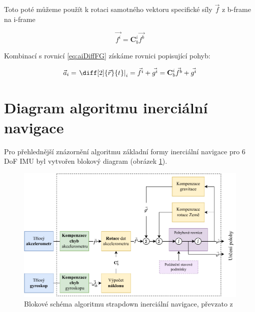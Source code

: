 Toto poté můžeme použít k rotaci samotného vektoru specifické síly $ \vec{f} $ z b-frame na i-frame

\begin{equation}
\vec{f^{i}} = \mathbf{C}_{b}^{i}\vec{f^{b}}
\end{equation}

Kombinací s rovnicí \ref{eq:aiDiffFG} získáme rovnici popisující pohyb:

\begin{equation}
\vec{a}_{i} = \left. \diff[2]{\vec{r}}{t} \right|_{i} = \vec{f^{i}} + \vec{g^{i}} = \mathbf{C}_{b}^{i}\vec{f^{b}} + \vec{g^{i}}
\end{equation}
\section{Diagram algoritmu inerciální navigace}
Pro přehlednější znázornění algoritmu základní formy inerciální navigace pro 6 \ac{DoF} \ac{IMU} byl vytvořen blokový diagram (obrázek \ref{StrapdownBlock}).

\begin{figure}[h]
    \centering
    \includegraphics[width=\textwidth]{obrazky/StrapdownBlock}
    \caption{Blokové schéma algoritmu strapdown inerciální navigace, převzato z \cite{Tittertonc2004} \cite{Grewal2013} }
    \label{StrapdownBlock}
\end{figure}
